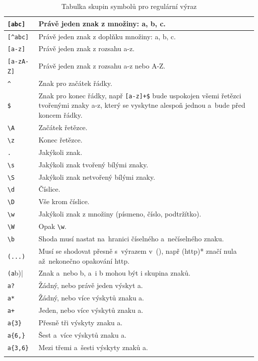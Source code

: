 \begin{center}
\begin{longtable}{| m{} | m{} |}
\hline
\verb|[abc]| & Právě jeden znak z množiny: a, b, c. \\
\hline
\verb|[^abc]| & Právě jeden znak z doplňku množiny: a, b, c. \\
\hline
\verb|[a-z]| & Právě jeden znak z rozsahu a-z. \\
\hline
\verb|[a-zA-Z]| & Právě jeden znak z rozsahu a-z nebo A-Z. \\
\hline
\verb|^| & Znak pro začátek řádky. \\
\hline
\verb|$| & Znak pro konec řádky, např \verb|[a-z]+$| bude uspokojen všemi řetězci tvořenými znaky a-z, který se vyskytne alespoň jednou a~bude před koncem řádky. \\
\hline
\verb|\A| & Začátek řetězce. \\
\hline
\verb|\z| & Konec řetězce. \\
\hline
\verb|.| & Jakýkoli znak. \\
\hline
\verb|\s| & Jakýkoli znak tvořený bílými znaky. \\
\hline
\verb|\S| & Jakýkoli znak netvořený bílými znaky. \\
\hline
\verb|\d| & Číslice. \\
\hline
\verb|\D| & Vše krom číslice. \\
\hline
\verb|\w| & Jakýkoli znak z množiny (písmeno, číslo, podtržítko). \\
\hline
\verb|\W| & Opak \verb|\w|. \\
\hline
\verb|\b| & Shoda musí nastat na~hranici číselného a~nečíselného znaku. \\
\hline
\verb|(...)| & Musí se shodovat přesně s~výrazem v~(), např (http)* značí nula až~nekonečno opakování http. \\
\hline
\verb|(a|b)| & Znak a~nebo b, a~i b mohou být i skupina znaků. \\
\hline
\verb|a?| & Žádný, nebo právě jeden výskyt a. \\
\hline
\verb|a*| & Žádný, nebo více výskytů znaku a. \\
\hline
\verb|a+| & Jeden, nebo více výskytů znaku a. \\
\hline
\verb|a{3}| & Přesně tři výskyty znaku a. \\
\hline
\verb|a{6,}| & Šest a~více výskytů znaku a. \\
\hline
\verb|a{3,6}| & Mezi třemi a~šesti výskyty znaků a. \\
\hline
\caption[Tabulka skupin symbolů pro regulární výraz]{Tabulka skupin symbolů pro regulární výraz}\label{tab:regexpr}
\end{longtable}
\end{center}


